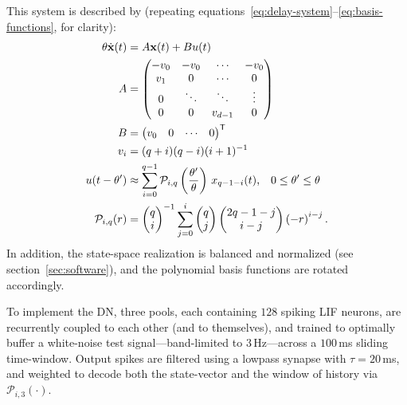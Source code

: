 This system is described by (repeating equations~\ref{eq:delay-system}--\ref{eq:basis-functions}, for clarity):
\begin{equation*}
\begin{aligned}
  \theta \dot{\V{x}}(t) &= A\V{x}(t) + Bu(t) \\
  A &= \begin{pmatrix} -v_0 & -v_0 & \cdots & -v_0 \\ v_1 & 0 & \cdots & 0 \\ 0 & \ddots & \ddots & \vdots \\ 0 & 0 & v_{d-1} & 0\end{pmatrix} \\
  B &= \transpose{\begin{pmatrix} v_0 & 0 & \cdots & 0\end{pmatrix}} \\
 v_i &= (q+i)(q-i)(i+1)^{-1} \\ %
  u(t - \theta') &\approx \sum_{i=0}^{q-1} \mathcal{P}_{i,q} \left(\frac{\theta'}{\theta} \right) \, x_{q-1-i}(t) \text{,} \quad 0 \le \theta' \le \theta \\
\mathcal{P}_{i,q}(r) &= \begin{pmatrix}q \\ i\end{pmatrix}^{-1} \sum_{j=0}^i \begin{pmatrix}q \\ j\end{pmatrix} \begin{pmatrix}2q - 1 - j \\ i - j\end{pmatrix} \left( -r \right)^{i - j} \text{.} %
\end{aligned}
\end{equation*}
In addition, the state-space realization is balanced and normalized (see section~\ref{sec:software}), and the polynomial basis functions are rotated accordingly.


To implement the DN, three pools, each containing $128$ spiking LIF neurons, are recurrently coupled to each other (and to themselves), and trained to optimally buffer a white-noise test signal---band-limited to $3$\,Hz---across a $100$\,ms sliding time-window.
Output spikes are filtered using a lowpass synapse with $\tau = 20$\,ms, and weighted to decode both the state-vector and the window of history via $\mathcal{P}_{i, 3}(\cdot)$. %

